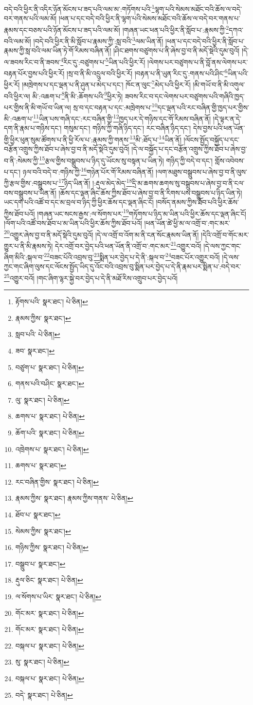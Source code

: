 བདེ་བའི་ཕྱིར་ནི་འདིར་ཉོན་མོངས་པ་ཟད་པའི་ལམ་མ་:གཏོགས་པའི་\footnote{རྟོགས་པའི་  སྣར་ཐང་།  པེ་ཅིན། }ལྷག་པའི་སེམས་མཐོང་བའི་ཆོས་ལ་བདེ་བར་གནས་པའི་ལམ་མོ། །ཕན་པ་དང་བདེ་བའི་ཕྱིར་ནི་ལྷག་པའི་སེམས་མཐོང་བའི་ཆོས་ལ་བདེ་བར་གནས་པ་རྣམས་དང་བཅས་པའི་ཉོན་མོངས་པ་ཟད་པའི་ལམ་མོ། །གཞན་ཡང་ཕན་པའི་ཕྱིར་ནི་སློབ་པ་:རྣམས་ཀྱི་\footnote{རྣམས་ཀྱིས་  སྣར་ཐང་། }དཀའ་བའི་ལམ་མོ། །བདེ་བའི་ཕྱིར་ནི་མི་སློབ་པ་རྣམས་ཀྱི་:སླ་བའི་\footnote{སླབ་པའི་  པེ་ཅིན། }ལམ་ཡིན་ནོ། །ཕན་པ་དང་བདེ་བའི་ཕྱིར་ནི་སློབ་པ་རྣམས་ཀྱི་སླ་བའི་ལམ་ཡིན་ཏེ་གོ་རིམས་བཞིན་ནོ། །ཤིང་ཐགས་བཙུགས་པ་ནི་ཞེས་བྱ་བ་ནི་མདོ་སྡེའི་དུམ་བུའོ། །དེ་ལ་ཟབས་རིང་བ་ནི་ཟབས་\footnote{ཟབ་  སྣར་ཐང་། }རིང་དུ་:བཙུགས་པ་\footnote{བཙུག་པ་  སྣར་ཐང་།  པེ་ཅིན། }ཡིན་པའི་ཕྱིར་རོ། །ལེགས་པར་བཙུགས་པ་ནི་བློ་ནས་ལེགས་པར་བརྟན་པོར་བྱས་པའི་ཕྱིར་རོ། །སྲ་བ་ནི་མི་འདྲུལ་བའི་ཕྱིར་རོ། །བརྟན་པ་ནི་ཡུན་རིང་དུ་:གནས་པའི་ཤིང་\footnote{གནས་པའི་བཤིང་  སྣར་ཐང་། }ཡིན་པའི་ཕྱིར་རོ། །མཁྲེགས་པ་དང་ལྡན་པ་ནི་ཤུན་པ་མེད་པ་དང་། ཁོང་ན་ལུང་\footnote{ལུ་  སྣར་ཐང་།  པེ་ཅིན། }མེད་པའི་ཕྱིར་རོ། །མི་གཡོ་བ་ནི་མི་འགུལ་བའི་ཕྱིར་ལ། མི་:འཆག་པ་\footnote{ཆགས་པ་  སྣར་ཐང་།  པེ་ཅིན། }ནི་མི་:ཆོགས་པའི་\footnote{ཆོག་པའི་  སྣར་ཐང་།  པེ་ཅིན། }ཕྱིར་ཏེ། ཟབས་རིང་བ་དང་ལེགས་པར་བཙུགས་པའི་གཞིའི་ཁྱད་པར་གྱིས་ནི་མི་གཡོ་བ་ཡིན་ལ། སྲ་བ་དང་བརྟན་པ་དང་:མཁྲེགས་པ་\footnote{འཁྲེགས་པ་  སྣར་ཐང་།  པེ་ཅིན། }དང་ལྡན་པའི་རང་བཞིན་གྱི་ཁྱད་པར་གྱིས་མི་:འཆག་པ་\footnote{ཆགས་པ་  སྣར་ཐང་། }ཡིན་པས་གཞི་དང་:རང་བཞིན་གྱི་\footnote{རང་བཞིན་གྱིས་  སྣར་ཐང་།  པེ་ཅིན། }ཁྱད་པར་དེ་གཉིས་དང་གོ་རིམས་བཞིན་ནོ། །དེ་ལྟར་ན་དེ་དག་ནི་རྣམ་པ་གཉིས་དང་། གསུམ་དང་། གཉིས་ཀྱི་གཞི་ཉིད་དང་། རང་བཞིན་ཉིད་དང་། དེས་བྱས་པའི་ཕན་ཡོན་གྱི་ཕྱིར་ཕུན་སུམ་ཚོགས་པ་ནི་ཕྱི་རོལ་པ་:རྣམས་ཀྱི་གནས་\footnote{རྣམས་ཀྱིས་  སྣར་ཐང་། རྣམས་ཀྱིས་གནས་  པེ་ཅིན། }མི་:ཐོད་པ་\footnote{ཐོབ་པ་  སྣར་ཐང་། }ཡིན་ནོ། །ལོངས་སྤྱོད་བསྐྱོད་པ་དང་བརྩོན་འགྲུས་ཀྱིས་ཐོབ་པ་ཞེས་བྱ་བ་ནི་མདོ་སྡེའི་དུམ་བུའོ། །དེ་ལ་བསྐྱོད་པ་དང་བརྩོན་འགྲུས་ཀྱིས་ཐོབ་པ་ཞེས་བྱ་བ་ནི་:སེམས་ཀྱི་\footnote{སེམས་ཀྱིས་  སྣར་ཐང་། }རྩལ་གྱིས་བསྒྲུབས་པ་ཉིད་དུ་ཡོངས་སུ་བསྟན་པ་ཡིན་ཏེ། གཉིད་ཀྱི་བདེ་བ་དང་། གློས་འབེབས་པ་དང་། ཉལ་བའི་བདེ་བ་:གཉིས་ཀྱི་\footnote{གཉིས་ཀྱིས་  སྣར་ཐང་།  པེ་ཅིན། }གཉེན་པོར་གོ་རིམས་བཞིན་ནོ། །ལག་མཐུས་བསྒྲུབས་པ་ཞེས་བྱ་བ་ནི་ལུས་ཀྱི་རྩལ་གྱིས་:བསྒྲུབས་པ་\footnote{བསྒྲུབ་པ་  སྣར་ཐང་། }ཉིད་ཡིན་ནོ། །:རྡུལ་མེད་མེད་\footnote{རྡུལ་ཅིང་  སྣར་ཐང་།  པེ་ཅིན། }དྲི་མ་ཆགས་ཆགས་སུ་བསྒྲུབས་པ་ཞེས་བྱ་བ་ནི་ངལ་བས་བསྒྲུབས་པ་ཡིན་ནོ། །ཆོས་དང་ལྡན་ཞིང་ཆོས་ཀྱིས་ཐོབ་པ་ཞེས་བྱ་བ་ནི་རིགས་པས་བསྒྲུབས་པ་ཉིད་ཡིན་ཏེ། ཡང་དག་པའི་འཚོ་བ་དང་མ་བྲལ་བ་ཉིད་ཀྱི་ཕྱིར་ཆོས་དང་ལྡན་ཞིང་ངོ། །བསོད་ནམས་ཀྱིས་ཐོབ་པའི་ཕྱིར་ཆོས་ཀྱིས་ཐོབ་པའོ། །གཞན་ཡང་སངས་རྒྱས་:ལ་སོགས་པར་\footnote{ལ་སོགས་པ་ཡིར་  སྣར་ཐང་།  པེ་ཅིན། }གཏོགས་པ་ཉིད་མ་ཡིན་པའི་ཕྱིར་ཆོས་དང་ལྡན་ཞིང་ངོ། །ལོག་པའི་འཚོ་བས་ཐོབ་པ་མ་ཡིན་པའི་ཕྱིར་ཆོས་ཀྱིས་ཐོབ་པའོ། །ཕན་ཡོན་ཚེ་ཕྱི་མ་ལ་འགྲོ་བ་:གང་མར་\footnote{གོང་མར་  སྣར་ཐང་།  པེ་ཅིན། }འགྱུར་ཞེས་བྱ་བ་ནི་མདོ་སྡེའི་དུམ་བུའོ། །དེ་ལ་འགྲོ་བ་འོག་མ་ནི་ངན་སོང་རྣམས་ཡིན་ནོ། །དེའི་འགྲོ་བ་གོང་མར་གྱུར་པ་ནི་མི་རྣམས་ཏེ། དེར་འགྲོ་བར་བྱེད་པའི་ཕན་ཡོན་ནི་འགྲོ་བ་:གང་མར་\footnote{གོང་མར་  སྣར་ཐང་།  པེ་ཅིན། }འགྱུར་བའོ། །དེ་ལས་ཀྱང་གང་ཞིག་མིའི་:སྐལ་བ་\footnote{བསྐལ་པ་  སྣར་ཐང་།  པེ་ཅིན། }བཟང་པོའི་འབྲས་བུ་\footnote{སུ་  སྣར་ཐང་།  པེ་ཅིན། }སྨིན་པར་བྱེད་པ་དེ་ནི་:སྐལ་བ་\footnote{བསྐལ་པ་  སྣར་ཐང་།  པེ་ཅིན། }བཟང་པོར་འགྱུར་བའོ། །དེ་ལས་ཀྱང་གང་ཞིག་ལུས་དང་ལོངས་སྤྱོད་ཡིད་དུ་འོང་བའི་འབྲས་བུ་སྨིན་པར་བྱེད་པ་དེ་ནི་རྣམ་པར་སྨིན་པ་:བདེ་བར་\footnote{བདེ་  སྣར་ཐང་།  པེ་ཅིན། }འགྱུར་བའོ། །གང་ཞིག་ལྷར་སྐྱེ་བར་བྱེད་པ་དེ་ནི་མཐོ་རིས་འགྲུབ་པར་བྱེད་པའོ། 